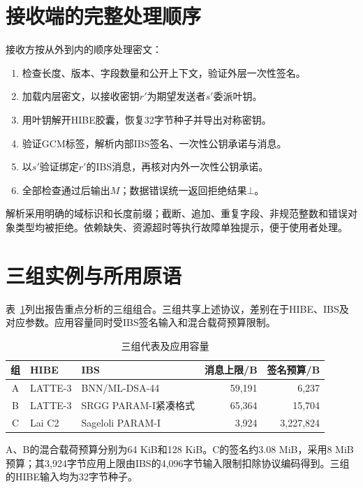 \section{接收端的完整处理顺序}
接收方按从外到内的顺序处理密文：
\begin{enumerate}
 \item 检查长度、版本、字段数量和公开上下文，验证外层一次性签名。
 \item 加载内层密文，以接收密钥$r'$为期望发送者$s'$委派叶钥。
 \item 用叶钥解开HIBE胶囊，恢复32字节种子并导出对称密钥。
 \item 验证GCM标签，解析内部IBS签名、一次性公钥承诺与消息。
 \item 以$s'$验证绑定$r'$的IBS消息，再核对内外一次性公钥承诺。
 \item 全部检查通过后输出$M$；数据错误统一返回拒绝结果$\bot$。
\end{enumerate}
解析采用明确的域标识和长度前缀；截断、追加、重复字段、非规范整数和错误对象类型均被拒绝。依赖缺失、资源超时等执行故障单独提示，便于使用者处理。

\section{三组实例与所用原语}
表~\ref{tab:representatives}列出报告重点分析的三组组合。三组共享上述协议，差别在于HIBE、IBS及对应参数。应用容量同时受IBS签名输入和混合载荷预算限制。

\begin{table}[H]
\centering\small
\caption{三组代表及应用容量}
\label{tab:representatives}
\begin{tabularx}{\textwidth}{@{}cp{}Xrr@{}}
\toprule
\rowcolor{black!8} 组 & HIBE & IBS & 消息上限/B & 签名预算/B \\
\midrule
A & LATTE-3 & BNN/ML-DSA-44 & 59,191 & 6,237 \\
B & LATTE-3 & SRGG PARAM-I紧凑格式 & 65,364 & 15,704 \\
C & Lai C2 & Sageloli PARAM-I & 3,924 & 3,227,824 \\
\bottomrule
\end{tabularx}
\end{table}

A、B的混合载荷预算分别为64 KiB和128 KiB。C的签名约3.08 MiB，采用8 MiB预算；其3,924字节应用上限由IBS的4,096字节输入限制扣除协议编码得到。三组的HIBE输入均为32字节种子。

